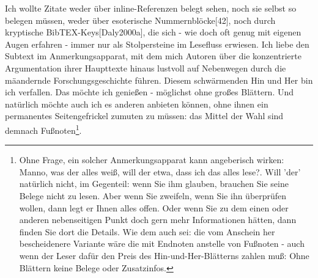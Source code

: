 Ich wollte Zitate weder über inline-Referenzen belegt sehen, noch sie selbst so
belegen müssen, weder über esoterische Nummernblöcke[42], noch durch kryptische
BibTEX-Keys[Daly2000a], die sich - wie doch oft genug mit eigenen Augen erfahren
- immer nur als Stolpersteine im Lesefluss erwiesen. Ich liebe den Subtext im
Anmerkungsapparat, mit dem mich Autoren über die konzentrierte Argumentation
ihrer Haupttexte hinaus lustvoll auf Nebenwegen durch die mäandernde
Forschungsgeschichte führen. Diesem schwärmenden Hin und Her bin ich verfallen.
Das möchte ich genießen - möglichst ohne großes Blättern. Und natürlich möchte
auch ich es anderen anbieten können, ohne ihnen ein permanentes Seitengefrickel
zumuten zu müssen: das Mittel der Wahl sind demnach Fußnoten\footnote{Ohne
Frage, ein solcher Anmerkungsapparat kann angeberisch wirken: \glq{}Manno, was
der alles weiß, will der etwa, dass ich das alles lese?\grq{}. Will 'der'
natürlich nicht, im Gegenteil: wenn Sie ihm glauben, brauchen Sie seine Belege
nicht zu lesen. Aber wenn Sie zweifeln, wenn Sie ihn überprüfen wollen, dann
legt er Ihnen alles offen. Oder wenn Sie zu dem einen oder anderen nebenseitigen
Punkt doch gern mehr Informationen hätten, dann finden Sie dort die Details. Wie
dem auch sei: die vom Anschein her bescheidenere Variante wäre die mit Endnoten
anstelle von Fußnoten - auch wenn der Leser dafür den Preis des
Hin-und-Her-Blätterns zahlen muß: Ohne Blättern keine Belege oder Zusatzinfos.}.


